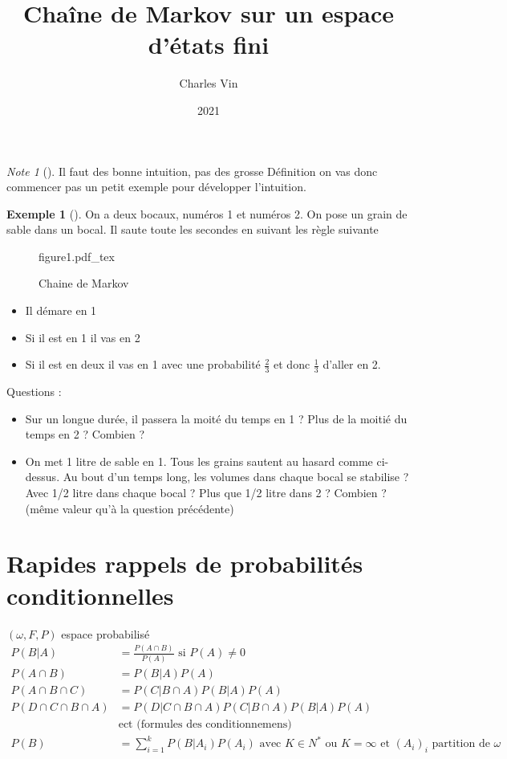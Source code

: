 \documentclass{article}
\title{Chaîne de Markov sur un espace d'états fini}
\author{Charles Vin}
\date{2021}
\newcommand{\incfig}[2][1]{%
	\def\svgwidth{#1\columnwidth}
	{#2.pdf_tex}
}
\theoremstyle{plain}%
\theoremstyle{definition}
\newtheorem{exmp}{Exemple}[section]
\theoremstyle{remark}
\newtheorem*{note}{Note}
\begin{document}
\maketitle



\begin{note}[]
	Il faut des bonne intuition, pas des grosse Définition on vas donc commencer pas un petit exemple pour développer l'intuition.
\end{note}

\begin{exmp}[]
	On a deux bocaux, numéros 1 et numéros 2. On pose un grain de sable dans un bocal. Il saute toute les secondes en suivant les règle suivante
	
	\begin{figure}[!htbp]
		\centering
		\incfig[0.5]{figure1}
		\caption{Chaine de Markov}
	\end{figure}

	\begin{itemize}
		\item Il démare en 1 
		\item Si il est en 1 il vas en 2
		\item Si il est en deux il vas en 1 avec une probabilité  $ \frac{2}{3} $ et donc  $ \frac{1}{3} $ d'aller en 2. 
	\end{itemize}
	Questions : 
	\begin{itemize}
		\item Sur un longue durée, il passera la moité du temps en 1 ? Plus de la moitié du temps en 2 ? Combien ? 
		\item On met 1 litre de sable en 1. Tous les grains sautent au hasard comme ci-dessus. Au bout d'un temps long, les volumes dans chaque bocal se stabilise ? Avec 1/2 litre dans chaque bocal ? Plus que 1/2 litre dans 2 ? Combien ? (même valeur qu'à la question précédente)
	\end{itemize}
\end{exmp}

\section{Rapides rappels de probabilités conditionnelles}
	$ (\omega , F, P) $ espace probabilisé \\
	\begin{align*}
		P(B|A) &= \frac{P(A \cap B)}{P(A)} \text{ si } P(A) \neq 0 \\
		P(A \cap B) &= P(B|A)P(A) \\
		P(A \cap B \cap C) &= P(C|B \cap A)P(B|A)P(A) \\
		P(D \cap C \cap B \cap A ) &= P(D|C \cap B \cap A) P(C | B \cap A) P(B|A) P(A) \\
		& \text{ect (formules des conditionnemens)} \\
		P(B) &= \sum_{i=1}^{k}P(B|A_i)P(A_i) \text{ avec } K \in N^* \text{ ou } K=\infty \text{ et } (A_i)_i \text{ partition de } \omega  
	\end{align*}
\end{document}
